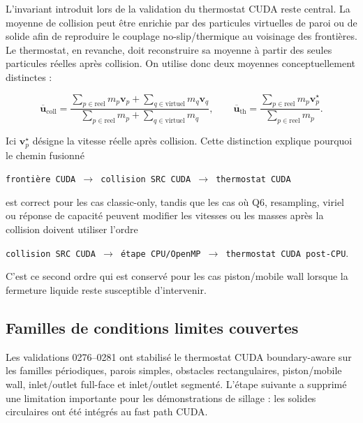 \documentclass[11pt,a4paper]{article}
\begin{document}
L'invariant introduit lors de la validation du thermostat CUDA reste central. La moyenne de collision peut être enrichie par des particules virtuelles de paroi ou de solide afin de reproduire le couplage no-slip/thermique au voisinage des frontières. Le thermostat, en revanche, doit reconstruire sa moyenne à partir des seules particules réelles après collision. On utilise donc deux moyennes conceptuellement distinctes :

\begin{equation}
  \overline{\mathbf{u}}_{\mathrm{coll}} =
  \frac{\sum_{p \in \mathrm{reel}} m_p \mathbf{v}_p
        + \sum_{q \in \mathrm{virtuel}} m_q \mathbf{v}_q}
       {\sum_{p \in \mathrm{reel}} m_p
        + \sum_{q \in \mathrm{virtuel}} m_q},
  \qquad
  \overline{\mathbf{u}}_{\mathrm{th}} =
  \frac{\sum_{p \in \mathrm{reel}} m_p \mathbf{v}_p^{\star}}
       {\sum_{p \in \mathrm{reel}} m_p}.
\end{equation}

Ici $\mathbf{v}_p^{\star}$ désigne la vitesse réelle après collision. Cette distinction explique pourquoi le chemin fusionné

\begin{center}
\texttt{frontière CUDA $\rightarrow$ collision SRC CUDA $\rightarrow$ thermostat CUDA}
\end{center}

est correct pour les cas classic-only, tandis que les cas où Q6, resampling, viriel ou réponse de capacité peuvent modifier les vitesses ou les masses après la collision doivent utiliser l'ordre

\begin{center}
\texttt{collision SRC CUDA $\rightarrow$ étape CPU/OpenMP $\rightarrow$ thermostat CUDA post-CPU}.
\end{center}

C'est ce second ordre qui est conservé pour les cas piston/mobile wall lorsque la fermeture liquide reste susceptible d'intervenir.

\subsection{Familles de conditions limites couvertes}

Les validations 0276--0281 ont stabilisé le thermostat CUDA boundary-aware sur les familles périodiques, parois simples, obstacles rectangulaires, piston/mobile wall, inlet/outlet full-face et inlet/outlet segmenté. L'étape suivante a supprimé une limitation importante pour les démonstrations de sillage : les solides circulaires ont été intégrés au fast path CUDA.
\end{document}
